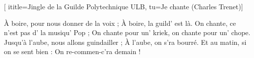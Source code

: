  [
ititle={Jingle de la Guilde Polytechnique ULB},
tu={Je chante (Charles Trenet)}]


\beginverse
À boire, pour nous donner de la voix ;
À boire, la guild' est là.
On chante, ce n'est pas d' la musiqu' Pop ;
On chante pour un' kriek, on chante pour un' chope.
Jusqu'à l'aube, nous allons guindailler ;
À l'aube, on s'ra bourré.
Et au matin, si on se sent bien :
On re-commen-c'ra demain !
\endverse
\endsong